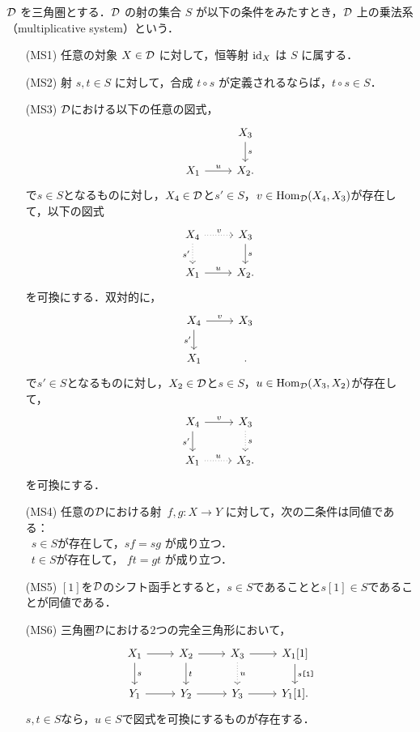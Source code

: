 \begin{defn}[乗法系]\cite[p.152]{KS06}\label{multiplicative}
${\mathcal D}$ を三角圏とする．${\mathcal D}$ の射の集合 $S$ が以下の条件をみたすとき，${\mathcal D}$ 上の乗法系（multiplicative system）という．
\begin{itemize}
  \item[(MS1)] 任意の対象 $X \in {\mathcal D}$ に対して，恒等射 $\mathrm{id}_X$ は $S$ に属する．
  
  \item[(MS2)] 射 $s, t \in S$ に対して，合成 $t \circ s$ が定義されるならば，$t \circ s \in S$．
  
  \item[(MS3)] ${\mathcal D}$における以下の任意の図式，
  \[
  \begin{tikzcd}
		& X_3 \ar[d, "s"] \\
  X_1 \ar[r, "u"] & X_2.
  \end{tikzcd}
  \]
	で$s\in S$となるものに対し，$X_4\in{\mathcal D}$と$s'\in S$，$v\in\operatorname{\mathrm{Hom}}_{{\mathcal D}}(X_4,X_3)$が存在して，以下の図式
  \[
  \begin{tikzcd}
  X_4 \ar[r,dotted,"v"] \ar[d, "s'"',dotted] & X_3 \ar[d, "s"] \\
  X_1 \ar[r, "u"] & X_2.
  \end{tikzcd}
  \]
	を可換にする．双対的に，
  \[
  \begin{tikzcd}
		X_4\ar[r,"v"]\ar[d,"s'",swap]& X_3\\
  X_1  & .
  \end{tikzcd}
  \]
	で$s'\in S$となるものに対し，$X_2\in{\mathcal D}$と$s\in S$，$u\in\operatorname{\mathrm{Hom}}_{{\mathcal D}}(X_3,X_2)$が存在して，
  \[
  \begin{tikzcd}
  X_4 \ar[r,"v"] \ar[d, "s'"'] & X_3 \ar[d, "s",dotted] \\
  X_1 \ar[r, "u",dotted] & X_2.
  \end{tikzcd}
  \]
	を可換にする．
\item[(MS4)]
任意の${\mathcal D}$における射\ $f,g: X \to Y$ に対して，次の二条件は同値である：\\
   \bullet\ $s \in S$が存在して，$sf = sg$ が成り立つ．\\
	\bullet\ 	$t \in S$が存在して， $ft = gt$ が成り立つ．

\item[(MS5)]
	$[1]$を${\mathcal D}$のシフト函手とすると，$s\in S$であることと$s[1]\in S$であることが同値である．
\item[(MS6)]
三角圏${\mathcal D}$における2つの完全三角形において，
			\[
		\begin{tikzcd}
			X_1\ar[r]\ar[d,"s"]& X_2\ar[r]\ar[d,"t"]& X_3\ar[r]\ar[d,"u",dotted] & X_1[1]\ar[d,"s\texttt{[1]}"]\\
			Y_1\ar[r]& Y_2\ar[r]& Y_3\ar[r] & Y_1[1].
		\end{tikzcd}
			\]
		$s,t\in S$なら，$u\in S$で図式を可換にするものが存在する．	
\end{itemize}
\end{defn}

